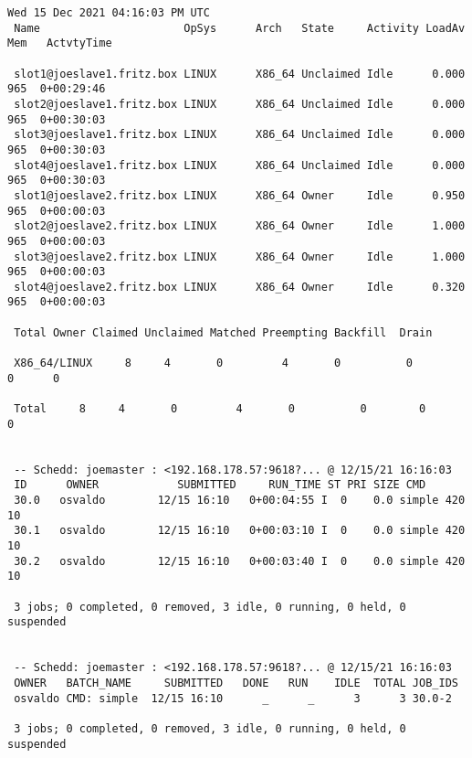 \begin{lstlisting}[style=output_tiny]
 Wed 15 Dec 2021 04:16:03 PM UTC
 Name                      OpSys      Arch   State     Activity LoadAv Mem   ActvtyTime
 
 slot1@joeslave1.fritz.box LINUX      X86_64 Unclaimed Idle      0.000  965  0+00:29:46
 slot2@joeslave1.fritz.box LINUX      X86_64 Unclaimed Idle      0.000  965  0+00:30:03
 slot3@joeslave1.fritz.box LINUX      X86_64 Unclaimed Idle      0.000  965  0+00:30:03
 slot4@joeslave1.fritz.box LINUX      X86_64 Unclaimed Idle      0.000  965  0+00:30:03
 slot1@joeslave2.fritz.box LINUX      X86_64 Owner     Idle      0.950  965  0+00:00:03
 slot2@joeslave2.fritz.box LINUX      X86_64 Owner     Idle      1.000  965  0+00:00:03
 slot3@joeslave2.fritz.box LINUX      X86_64 Owner     Idle      1.000  965  0+00:00:03
 slot4@joeslave2.fritz.box LINUX      X86_64 Owner     Idle      0.320  965  0+00:00:03
 
 Total Owner Claimed Unclaimed Matched Preempting Backfill  Drain
 
 X86_64/LINUX     8     4       0         4       0          0        0      0
 
 Total     8     4       0         4       0          0        0      0
 
 
 -- Schedd: joemaster : <192.168.178.57:9618?... @ 12/15/21 16:16:03
 ID      OWNER            SUBMITTED     RUN_TIME ST PRI SIZE CMD
 30.0   osvaldo        12/15 16:10   0+00:04:55 I  0    0.0 simple 420 10
 30.1   osvaldo        12/15 16:10   0+00:03:10 I  0    0.0 simple 420 10
 30.2   osvaldo        12/15 16:10   0+00:03:40 I  0    0.0 simple 420 10
 
 3 jobs; 0 completed, 0 removed, 3 idle, 0 running, 0 held, 0 suspended
 
 
 -- Schedd: joemaster : <192.168.178.57:9618?... @ 12/15/21 16:16:03
 OWNER   BATCH_NAME     SUBMITTED   DONE   RUN    IDLE  TOTAL JOB_IDS
 osvaldo CMD: simple  12/15 16:10      _      _      3      3 30.0-2
 
 3 jobs; 0 completed, 0 removed, 3 idle, 0 running, 0 held, 0 suspended
 
 
 
\end{lstlisting}

